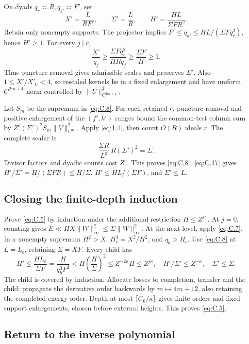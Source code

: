 \documentclass[11pt,a4paper]{article}
\begin{document}
On dyads \(q_r\asymp R,q_{f'}\asymp F'\), set \[
X'=\frac L{RF'},\qquad \Sigma'=\frac LR,
\qquad H'=\frac{HL}{\Sigma FR^2}.
\tag{C.17}\label{eq:C.17}
\] Retain only nonempty supports. The projector implies \(F'\le q_{k'}\le HL/(\Sigma Fq_r^2)\), hence \(H'\ge1\). For every \(j\mid r\), \[
\frac{X'}{q_j}\ge\frac{\Sigma Fq_r^2}{HRq_j}
\ge\frac{\Sigma F}{H}\ge1.
\tag{C.18}\label{eq:C.18}
\] Thus puncture removal gives admissible scales and preserves \(\Sigma'\). Also \(1\le X'/X'_0<4\), so rescaled kernels lie in a fixed enlargement and have uniform \(C^{2m+4}\) norm controlled by \(\|U\|_{C^{2m+4}}^2\).

Let \(S_m\) be the supremum in \eqref{eq:C.8}. For each retained \(r\), puncture removal and positive enlargement of the \((f',k')\) ranges bound the common-test column sum by \(Z^\varepsilon(\Sigma')^2S_m\|V\|_{C^m}^2\). Apply \eqref{eq:1.4}, then count \(O(R)\) ideals \(r\). The complete scalar is \[
\frac{\Sigma R}{L^2}\,R(\Sigma')^2=\Sigma.
\] Divisor factors and dyadic counts cost \(Z^\varepsilon\). This proves \eqref{eq:C.8}; \eqref{eq:C.17} gives \(H'/\Sigma'=H/(\Sigma FR)\le H/\Sigma\), \(H'\le HL/(\Sigma F)\), and \(\Sigma'\le L\).

\subsection{Closing the finite-depth induction}\label{sec:C.4}

Prove \eqref{eq:C.5} by induction under the additional restriction \(H\le Z^{j\kappa}\). At \(j=0\), counting gives \(E\ll HX\|W\|_\infty^2\le\Sigma\|W\|_\infty^2\). At the next level, apply \eqref{eq:C.7}. In a nonempty supremum \(H^2>X\), \(H_c^3=X^2/H^2\), and \(q_b>H_c\). Use \eqref{eq:C.8} at \(L=L_b\), retaining \(\Sigma=XF\). Every child has \[
H'\le\frac{HL_b}{\Sigma F}=\frac H{q_b^3F^2}
<H\left(\frac H\Sigma\right)^2
\le Z^{-2\kappa}H\le Z^{j\kappa},
\quad H'/\Sigma'\le Z^{-\kappa},\quad \Sigma'\le\Sigma.
\] The child is covered by induction. Allocate losses to completion, transfer and the child; propagate the derivative order backwards by \(m\mapsto4m+12\), also retaining the completed-energy order. Depth at most \(\lceil C_0/\kappa\rceil\) gives finite orders and fixed support enlargements, chosen before external heights. This proves \eqref{eq:C.5}.

\subsection{Return to the inverse polynomial}\label{sec:C.5}
\end{document}
